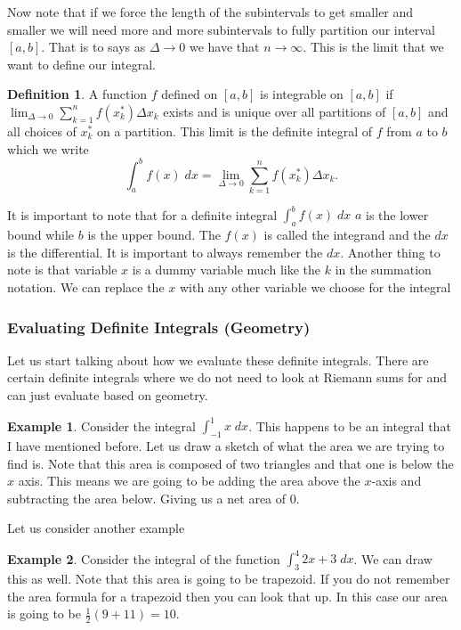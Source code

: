 \documentclass[12pt,reqno]{article}
\theoremstyle{definition}
\newtheorem*{Definition}{Definition}
\newtheorem*{Example}{Example}
\begin{document}
Now note that if we force the length of the subintervals to get smaller and smaller we will need more and more subintervals to fully partition our interval $[a, b]$. That is to says as $\Delta \to 0$ we have that $n \to \infty$. This is the limit that we want to define our integral. 
\begin{Definition}
	A function $f$ defined on $[a, b]$ is integrable on $[a, b]$ if $\lim_{\Delta \to 0} \sum_{k = 1}^{n} f(x_{k}^*) \Delta x_k$ exists and is unique over all partitions of $[a, b]$ and all choices of $x_{k}^{*}$ on a partition. This limit is the definite integral of $f$ from $a$ to $b$ which we write $$\int_{a}^{b} f(x) \; dx = \lim_{\Delta \to 0} \sum_{k = 1}^{n} f(x_{k}^*) \Delta x_k.$$
\end{Definition}

It is important to note that for a definite integral $\int_{a}^{b} f(x) \; dx$ $a$ is the lower bound while $b$ is the upper bound. The $f(x)$ is called the integrand and the $dx$ is the differential. It is important to always remember the $dx$. Another thing to note is that variable $x$ is a dummy variable much like the $k$ in the summation notation. We can replace the $x$ with any other variable we choose for the integral

\subsubsection{Evaluating Definite Integrals (Geometry)} 

Let us start talking about how we evaluate these definite integrals. There are certain definite integrals where we do not need to look at Riemann sums for and can just evaluate based on geometry. 

\begin{Example}
	Consider the integral $\int_{-1}^{1} x \; dx$. This happens to be an integral that I have mentioned before. Let us draw a sketch of what the area we are trying to find is. Note that this area is composed of two triangles and that one is below the $x$ axis. This means we are going to be adding the area above the $x$-axis and subtracting the area below. Giving us a net area of $0$. 
\end{Example}

Let us consider another example 
\begin{Example}
	Consider the integral of the function $\int_{3}^{4} 2x  + 3 \; dx$. We can draw this as well. Note that this area is going to be trapezoid. If you do not remember the area formula for a trapezoid then you can look that up. In this case our area is going to be $\frac{1}{2}(9 + 11) = 10$. 
\end{Example}
\end{document}

